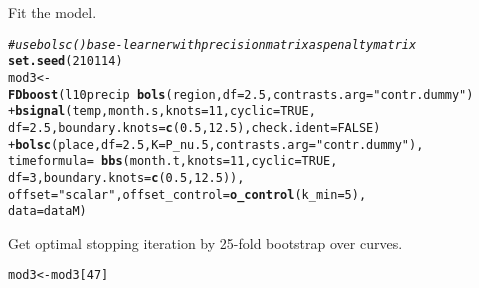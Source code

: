 \documentclass{article}\usepackage[]{graphicx}\usepackage[]{color}
\makeatletter
\newcommand{\hlnum}[1]{\textcolor[rgb]{0.686,0.059,0.569}{#1}}%
\newcommand{\hlstr}[1]{\textcolor[rgb]{0.192,0.494,0.8}{#1}}%
\newcommand{\hlcom}[1]{\textcolor[rgb]{0.678,0.584,0.686}{\textit{#1}}}%
\newcommand{\hlopt}[1]{\textcolor[rgb]{0,0,0}{#1}}%
\newcommand{\hlstd}[1]{\textcolor[rgb]{0.345,0.345,0.345}{#1}}%
\newcommand{\hlkwb}[1]{\textcolor[rgb]{0.69,0.353,0.396}{#1}}%
\newcommand{\hlkwc}[1]{\textcolor[rgb]{0.333,0.667,0.333}{#1}}%
\newcommand{\hlkwd}[1]{\textcolor[rgb]{0.737,0.353,0.396}{\textbf{#1}}}%
\newenvironment{kframe}{%
 \def\at@end@of@kframe{}%
 \ifinner\ifhmode%
  \def\at@end@of@kframe{\end{minipage}}%
  \begin{minipage}{\columnwidth}%
 \fi\fi%
 \def\FrameCommand##1{\hskip\@totalleftmargin \hskip-\fboxsep
 \colorbox{shadecolor}{##1}\hskip-\fboxsep
     \hskip-\linewidth \hskip-\@totalleftmargin \hskip\columnwidth}%
 \MakeFramed {\advance\hsize-\width
   \@totalleftmargin\z@ \linewidth\hsize
   \@setminipage}}%
 {\par\unskip\endMakeFramed%
 \at@end@of@kframe}
\newenvironment{knitrout}{}{} %
\makeatother
\begin{document}
Fit the model.
\begin{knitrout}
\color{fgcolor}\begin{kframe}
\begin{alltt}
\hlcom{# use bolsc() base-learner with precision matrix as penalty matrix}
\hlkwd{set.seed}\hlstd{(}\hlnum{210114}\hlstd{)}
\hlstd{mod3} \hlkwb{<-} \hlkwd{FDboost}\hlstd{(l10precip} \hlopt{~} \hlkwd{bols}\hlstd{(region,} \hlkwc{df} \hlstd{=} \hlnum{2.5}\hlstd{,} \hlkwc{contrasts.arg} \hlstd{=} \hlstr{"contr.dummy"}\hlstd{)}
                \hlopt{+} \hlkwd{bsignal}\hlstd{(temp, month.s,} \hlkwc{knots} \hlstd{=} \hlnum{11}\hlstd{,} \hlkwc{cyclic} \hlstd{=} \hlnum{TRUE}\hlstd{,}
                          \hlkwc{df} \hlstd{=} \hlnum{2.5}\hlstd{,} \hlkwc{boundary.knots} \hlstd{=} \hlkwd{c}\hlstd{(}\hlnum{0.5}\hlstd{,} \hlnum{12.5}\hlstd{),} \hlkwc{check.ident} \hlstd{=} \hlnum{FALSE}\hlstd{)}
                \hlopt{+} \hlkwd{bolsc}\hlstd{(place,} \hlkwc{df} \hlstd{=} \hlnum{2.5}\hlstd{,} \hlkwc{K} \hlstd{= P_nu.5,} \hlkwc{contrasts.arg} \hlstd{=} \hlstr{"contr.dummy"}\hlstd{),}
                \hlkwc{timeformula} \hlstd{=} \hlopt{~} \hlkwd{bbs}\hlstd{(month.t,} \hlkwc{knots} \hlstd{=} \hlnum{11}\hlstd{,} \hlkwc{cyclic} \hlstd{=} \hlnum{TRUE}\hlstd{,}
                                 \hlkwc{df}\hlstd{=}\hlnum{3}\hlstd{,} \hlkwc{boundary.knots} \hlstd{=} \hlkwd{c}\hlstd{(}\hlnum{0.5}\hlstd{,} \hlnum{12.5}\hlstd{)),}
                \hlkwc{offset}\hlstd{=}\hlstr{"scalar"}\hlstd{,} \hlkwc{offset_control} \hlstd{=} \hlkwd{o_control}\hlstd{(}\hlkwc{k_min} \hlstd{=} \hlnum{5}\hlstd{),}
                \hlkwc{data}\hlstd{=dataM)}
\end{alltt}
\end{kframe}
\end{knitrout}


Get optimal stopping iteration by 25-fold bootstrap over curves.

\begin{knitrout}
\color{fgcolor}\begin{kframe}
\begin{alltt}
\hlstd{mod3} \hlkwb{<-} \hlstd{mod3[}\hlnum{47}\hlstd{]}
\end{alltt}
\end{kframe}
\end{knitrout}
\end{document}
